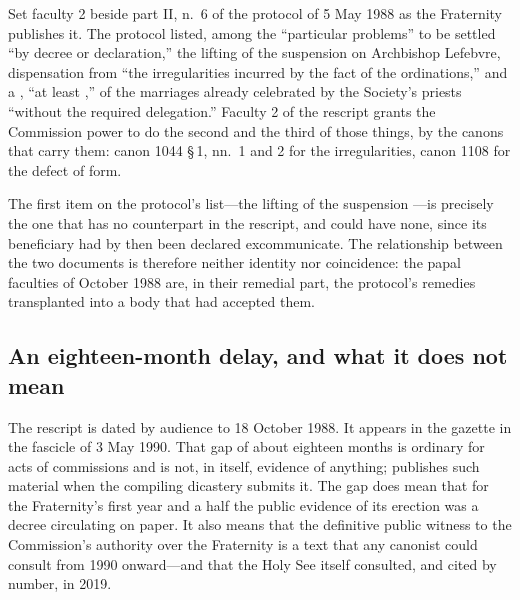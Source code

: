 Set faculty 2 beside part II, n.~6 of the protocol of 5 May 1988 as the
Fraternity publishes it. The protocol listed, among the ``particular
problems'' to be settled ``by decree or declaration,'' the lifting of the
suspension  on Archbishop Lefebvre, dispensation from
``the irregularities incurred by the fact of the ordinations,'' and a
, ``at least ,'' of the
marriages already celebrated by the Society's priests ``without the
required delegation.'' Faculty 2 of the rescript grants the Commission
power to do the second and the third of those things, by the canons that
carry them: canon 1044 §\,1, nn.~1 and 2 for the irregularities, canon
1108 for the defect of form.

The first item on the protocol's list---the lifting of the suspension
---is precisely the one that has no counterpart in the
rescript, and could have none, since its beneficiary had by then been
declared excommunicate. The relationship between the two documents is
therefore neither identity nor coincidence: the papal faculties of
October 1988 are, in their remedial part, the protocol's remedies
transplanted into a body that had accepted them.

\subsection{An eighteen-month delay, and what it does not mean}

The rescript is dated by audience to 18 October 1988. It appears in the
gazette in the fascicle of 3 May 1990. That gap of about eighteen months
is ordinary for acts of commissions and is not, in itself, evidence of
anything;  publishes such material when the
compiling dicastery submits it. The gap does mean that for the
Fraternity's first year and a half the public evidence of its erection
was a decree circulating on paper. It also means that the definitive
public witness to the Commission's authority over the Fraternity is a
text that any canonist could consult from 1990 onward---and that the
Holy See itself consulted, and cited by number, in 2019.

